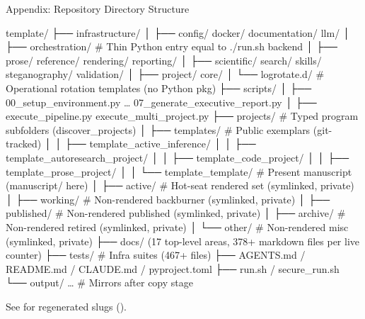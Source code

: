 \documentclass[
  ignorenonframetext,
]{beamer}
\author{\texorpdfstring{}{}}
\date{}
\newenvironment{Shaded}{}{}
\newcommand{\NormalTok}[1]{#1}
\begin{document}
\begin{frame}
\newpage
\end{frame}

\begin{frame}{Appendix: Repository Directory
Structure}
\protect{}\label{appendix-directory}
\begin{Shaded}
\begin{Highlighting}[]
\NormalTok{template/}
\NormalTok{├── infrastructure/}
\NormalTok{│   ├── config/ docker/ documentation/ llm/}
\NormalTok{│   ├── orchestration/   \# Thin Python entry equal to \textasciigrave{}./run.sh\textasciigrave{} backend}
\NormalTok{│   ├── prose/ reference/ rendering/ reporting/}
\NormalTok{│   ├── scientific/ search/ skills/ steganography/ validation/}
\NormalTok{│   ├── project/ core/}
\NormalTok{│   └── logrotate.d/      \# Operational rotation templates (no Python pkg)}
\NormalTok{├── scripts/}
\NormalTok{│   ├── 00\_setup\_environment.py … 07\_generate\_executive\_report.py}
\NormalTok{│   ├── execute\_pipeline.py execute\_multi\_project.py}
\NormalTok{├── projects/                    \# Typed program subfolders (\textasciigrave{}discover\_projects\textasciigrave{})}
\NormalTok{│   ├── templates/               \# Public exemplars (git{-}tracked)}
\NormalTok{│   │   ├── template\_active\_inference/}
\NormalTok{│   │   ├── template\_autoresearch\_project/}
\NormalTok{│   │   ├── template\_code\_project/}
\NormalTok{│   │   ├── template\_prose\_project/}
\NormalTok{│   │   └── template\_template/   \# Present manuscript (\textasciigrave{}manuscript/\textasciigrave{} here)}
\NormalTok{│   ├── active/                  \# Hot{-}seat rendered set (symlinked, private)}
\NormalTok{│   ├── working/                 \# Non{-}rendered backburner (symlinked, private)}
\NormalTok{│   ├── published/               \# Non{-}rendered published (symlinked, private)}
\NormalTok{│   ├── archive/                 \# Non{-}rendered retired (symlinked, private)}
\NormalTok{│   └── other/                   \# Non{-}rendered misc (symlinked, private)}
\NormalTok{├── docs/ (17 top{-}level areas, 378+ markdown files per live counter)}
\NormalTok{├── tests/                       \# Infra suites (467+ files)}
\NormalTok{├── AGENTS.md / README.md / CLAUDE.md / pyproject.toml}
\NormalTok{├── run.sh / secure\_run.sh}
\NormalTok{└── output/ …                    \# Mirrors after copy stage}
\end{Highlighting}
\end{Shaded}

See  for regenerated slugs
().
\end{frame}
\end{document}
